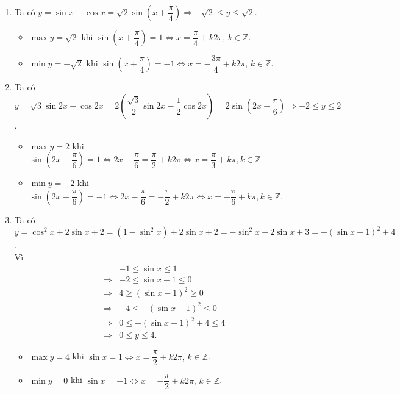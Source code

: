 \begin{ex}
{\begin{enumerate}
\begin{itemize}
				\item  $\min y=-3$ khi $\cos x=-1\Leftrightarrow x=\pi+k2\pi,\,k\in\mathbb{Z}$.
			\end{itemize}
			\item Ta  có $y=\sin x+\cos x=\sqrt{2}\sin\left(x+\dfrac{\pi}{4}\right)\Rightarrow-\sqrt{2}\leq y\leq\sqrt{2}$.
			\begin{itemize}
				\item $\max y=\sqrt{2}$ khi $\sin\left(x+\dfrac{\pi}{4}\right)=1\Leftrightarrow x=\dfrac{\pi}{4}+k2\pi,\,k\in\mathbb{Z}$. 
				\item  $\min y=-\sqrt{2}$ khi $\sin\left(x+\dfrac{\pi}{4}\right)=-1\Leftrightarrow x=-\dfrac{3\pi}{4}+k2\pi,\,k\in\mathbb{Z}$.
			\end{itemize}
			\item Ta  có $y=\sqrt{3}\sin 2x-\cos 2x=2\left(\dfrac{\sqrt{3}}{2}\sin 2x-\dfrac{1}{2}\cos 2x\right)=2\sin\left(2x-\dfrac{\pi}{6}\right)\Rightarrow-2\leq y\leq 2$.
			\begin{itemize}
				\item $\max y=2$ khi $\sin\left(2x-\dfrac{\pi}{6}\right)=1\Leftrightarrow 2x-\dfrac{\pi}{6}=\dfrac{\pi}{2}+k2\pi\Leftrightarrow x=\dfrac{\pi}{3}+k\pi,  k\in\mathbb{Z}$.
				\item $\min y=-2$  khi $\sin\left(2x-\dfrac{\pi}{6}\right)=-1\Leftrightarrow 2x-\dfrac{\pi}{6}=-\dfrac{\pi}{2}+k2\pi\Leftrightarrow x=-\dfrac{\pi}{6}+k\pi, k\in\mathbb{Z}$.
			\end{itemize}
			\item Ta có 
			$y=\cos^2x+2\sin x+2=(1-\sin^2x)+2\sin x+2=-\sin^2x+2\sin x+3=-(\sin x-1)^2+4$.\\ 
			Vì  \allowdisplaybreaks
			\begin{eqnarray*}
				&&-1 \leq \sin x  \leq 1\\
				& \Rightarrow& -2 \leq \sin  x - 1 \leq 0 \\
				&\Rightarrow& 4 \geq (\sin x - 1)^2 \geq  0\\
				 &\Rightarrow &-4 \leq -(\sin x - 1)^2 \leq 0 \\
				&\Rightarrow& 0 \leq -(\sin x  - 1)^2 + 4 \leq 4 \\
				&\Rightarrow& 0 \leq y \leq  4.
			\end{eqnarray*}
			\begin{itemize}
				\item $\max y=4$ khi $\sin  x=1\Leftrightarrow x=\dfrac{\pi}{2}+k2\pi,\,k\in\mathbb{Z}$.
				 \item $\min y=0$ khi $\sin x=-1\Leftrightarrow x=-\dfrac{\pi}{2}+k2\pi,\,k\in\mathbb{Z}$.

\end{itemize}
\end{enumerate}}
\end{ex}
